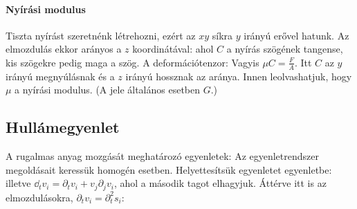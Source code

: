    \paragraph{Nyírási modulus}
    
    Tiszta nyírást szeretnénk létrehozni, ezért az $xy$ síkra $y$ irányú erővel hatunk. Az elmozdulás ekkor arányos a $z$ koordinátával:
    ahol $C$ a nyírás szögének tangense, kis szögekre pedig maga a szög. A deformációtenzor:
    Vagyis $\mu C=\frac{F}{A}$. Itt $C$ az $y$ irányú megnyúlásnak és a $z$ irányú hossznak az aránya. Innen leolvashatjuk, hogy $\mu$ a nyírási modulus. (A jele általános esetben $G$.)
    
  \subsection{Hullámegyenlet}
   
   A rugalmas anyag mozgását meghatározó egyenletek:
   Az egyenletrendszer megoldásait keressük homogén esetben. Helyettesítsük  egyenletet  egyenletbe:
   illetve $\dd_t v_i=\partial_t v_i+v_j\partial_j v_i$, ahol a második tagot elhagyjuk. Áttérve itt is az elmozdulásokra, $\partial_tv_i=\partial_t^2s_i$:
